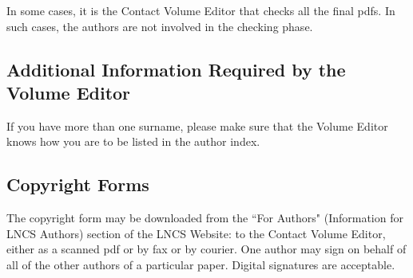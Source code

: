 In some cases, it is the Contact Volume Editor that checks all the final
pdfs. In such cases, the authors are not involved in the checking phase.


\subsection{Additional Information Required by the Volume Editor}


If you have more than one surname, please make sure that the Volume Editor
knows how you are to be listed in the author index.


\subsection{Copyright Forms}


The copyright form may be downloaded from the ``For Authors"
(Information for LNCS Authors) section of the LNCS Website:
to the Contact Volume Editor, either as a scanned pdf or by fax or by
courier. One author may sign on behalf of all of the other authors of a
particular paper. Digital signatures are acceptable.
